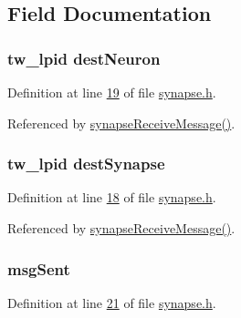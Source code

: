 \subsection{Field Documentation}
\hypertarget{structsynapse_state_a0710dca002b4b3a3f7ae72633bef3691}{}
\subsubsection[{dest\+Neuron}]{\setlength{\rightskip}{0pt plus 5cm}tw\+\_\+lpid dest\+Neuron}\label{structsynapse_state_a0710dca002b4b3a3f7ae72633bef3691}


Definition at line \hyperlink{synapse_8h_source_l00019}{19} of file \hyperlink{synapse_8h_source}{synapse.\+h}.



Referenced by \hyperlink{synapse_8c_source_l00011}{synapse\+Receive\+Message()}.

\hypertarget{structsynapse_state_a665999819b255f36d756f17b85bc9a03}{}
\subsubsection[{dest\+Synapse}]{\setlength{\rightskip}{0pt plus 5cm}tw\+\_\+lpid dest\+Synapse}\label{structsynapse_state_a665999819b255f36d756f17b85bc9a03}


Definition at line \hyperlink{synapse_8h_source_l00018}{18} of file \hyperlink{synapse_8h_source}{synapse.\+h}.



Referenced by \hyperlink{synapse_8c_source_l00011}{synapse\+Receive\+Message()}.

\hypertarget{structsynapse_state_a7d208d07285a221f4ef19f6fa307b536}{}
\subsubsection[{msg\+Sent}]{ msg\+Sent}\label{structsynapse_state_a7d208d07285a221f4ef19f6fa307b536}


Definition at line \hyperlink{synapse_8h_source_l00021}{21} of file \hyperlink{synapse_8h_source}{synapse.\+h}.



